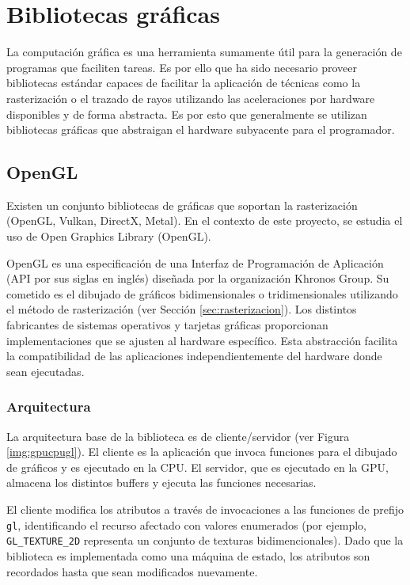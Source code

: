 \section{Bibliotecas gráficas}

La computación gráfica es una herramienta sumamente útil para la generación de programas que faciliten tareas. Es por ello que ha sido necesario proveer bibliotecas estándar capaces de facilitar la aplicación de técnicas como la rasterización o el trazado de rayos utilizando las aceleraciones por hardware disponibles y de forma abstracta. Es por esto que generalmente se utilizan bibliotecas gráficas que abstraigan el hardware subyacente para el programador.

\subsection{OpenGL}

Existen un conjunto bibliotecas de gráficas que soportan la rasterización (OpenGL, Vulkan, DirectX, Metal). En el contexto de este proyecto, se estudia el uso de Open Graphics Library (OpenGL).

OpenGL es una especificación de una Interfaz de Programación de Aplicación (API por sus siglas en inglés) diseñada por la organización Khronos Group. Su cometido es el dibujado de gráficos bidimensionales o tridimensionales utilizando el método de rasterización (ver Sección \ref{sec:rasterizacion}). Los distintos fabricantes de sistemas operativos y tarjetas gráficas proporcionan implementaciones que se ajusten al hardware específico. Esta abstracción facilita la compatibilidad de las aplicaciones independientemente del hardware donde sean ejecutadas.

\subsubsection{Arquitectura}
La arquitectura base de la biblioteca es de cliente/servidor (ver Figura \ref{img:gpucpugl}). El cliente es la aplicación que invoca funciones para el dibujado de gráficos y es ejecutado en la CPU. El servidor, que es ejecutado en la GPU, almacena los distintos buffers y ejecuta las funciones necesarias.

El cliente modifica los atributos a través de invocaciones a las funciones de prefijo \verb|gl|, identificando el recurso afectado con valores enumerados (por ejemplo, \verb|GL_TEXTURE_2D| representa un conjunto de texturas bidimencionales). Dado que la biblioteca es implementada como una máquina de estado, los atributos son recordados hasta que sean modificados nuevamente.

